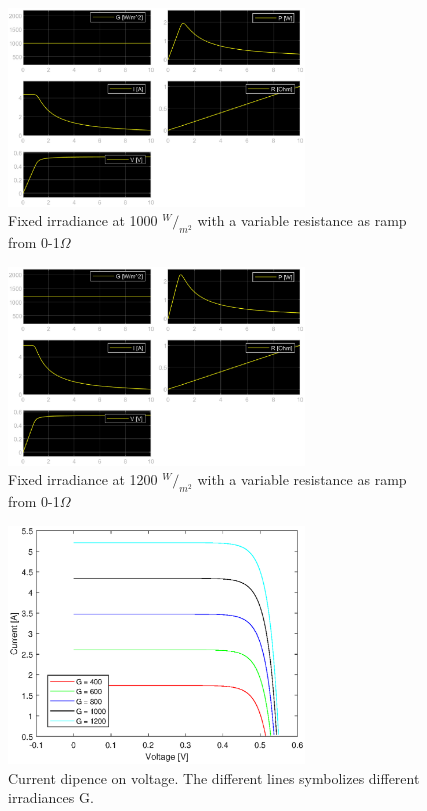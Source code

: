 		\begin{figure}[H]
			\centering
			\includegraphics[width=0.7\textwidth]{figures/g1000.eps}
			\caption{Fixed irradiance at 1000 $^W/_{m^2}$ with a variable resistance as ramp from 0-1$\Omega$}
			\label{fig:g1000}
		\end{figure}	
		\begin{figure}[H]
			\centering
			\includegraphics[width=0.7\textwidth]{figures/g1200.eps}
			\caption{Fixed irradiance at 1200 $^W/_{m^2}$ with a variable resistance as ramp from 0-1$\Omega$}
			\label{fig:g1200}
		\end{figure}	
		\begin{figure}[H]
			\centering
			\includegraphics[width=0.7\textwidth]{figures/g_in_one.eps}
			\caption[Current dipence on voltage.]{Current dipence on voltage. The different lines symbolizes different irradiances G.}
			\label{fig:allg}
		\end{figure}
	
